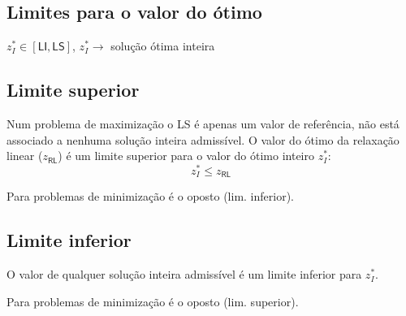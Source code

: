 \documentclass[10pt, a4paper]{article}
\begin{document}
\begin{multicols}{2}
\subsection{Limites para o valor do ótimo}

\(z_I^* \in [\textsf{LI}, \textsf{LS}]\), \(z_I^* \rightarrow\) solução ótima inteira

\subsection{Limite superior}

Num problema de maximização o LS é apenas um valor de referência, não está associado a nenhuma solução inteira admissível. O valor do ótimo da relaxação linear (\(z_\textsf{RL}\)) é um limite superior para o valor do ótimo inteiro \(z_I^*\):
\[z_I^* \le z_\textsf{RL}\]

\vspace{0.25cm}

Para problemas de minimização é o oposto (lim. inferior).

\subsection{Limite inferior}

O valor de qualquer solução inteira admissível é um limite inferior para \(z_I^*\). 

Para problemas de minimização é o oposto (lim. superior).

\end{multicols}
\end{document}
